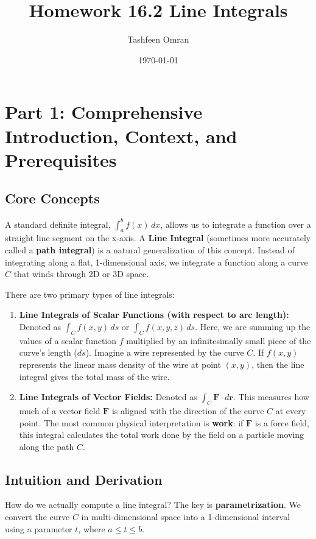 \documentclass{article}
\title{Homework 16.2 Line Integrals}
\author{Tashfeen Omran}
\date{\today}
\begin{document}
\maketitle
\tableofcontents
\newpage

\section{Part 1: Comprehensive Introduction, Context, and Prerequisites}

\subsection{Core Concepts}
A standard definite integral, $\int_a^b f(x) \, dx$, allows us to integrate a function over a straight line segment on the x-axis. A \textbf{Line Integral} (sometimes more accurately called a \textbf{path integral}) is a natural generalization of this concept. Instead of integrating along a flat, 1-dimensional axis, we integrate a function along a curve $C$ that winds through 2D or 3D space. 

There are two primary types of line integrals:
\begin{enumerate}
    \item \textbf{Line Integrals of Scalar Functions (with respect to arc length):} Denoted as $\int_C f(x, y) \, ds$ or $\int_C f(x, y, z) \, ds$. Here, we are summing up the values of a scalar function $f$ multiplied by an infinitesimally small piece of the curve's length ($ds$). Imagine a wire represented by the curve $C$. If $f(x, y)$ represents the linear mass density of the wire at point $(x, y)$, then the line integral gives the total mass of the wire.
    \item \textbf{Line Integrals of Vector Fields:} Denoted as $\int_C \mathbf{F} \cdot d\mathbf{r}$. This measures how much of a vector field $\mathbf{F}$ is aligned with the direction of the curve $C$ at every point. The most common physical interpretation is \textbf{work}: if $\mathbf{F}$ is a force field, this integral calculates the total work done by the field on a particle moving along the path $C$.
\end{enumerate}

\subsection{Intuition and Derivation}
How do we actually compute a line integral? The key is \textbf{parametrization}. We convert the curve $C$ in multi-dimensional space into a 1-dimensional interval using a parameter $t$, where $a \leq t \leq b$. 
\end{document}
